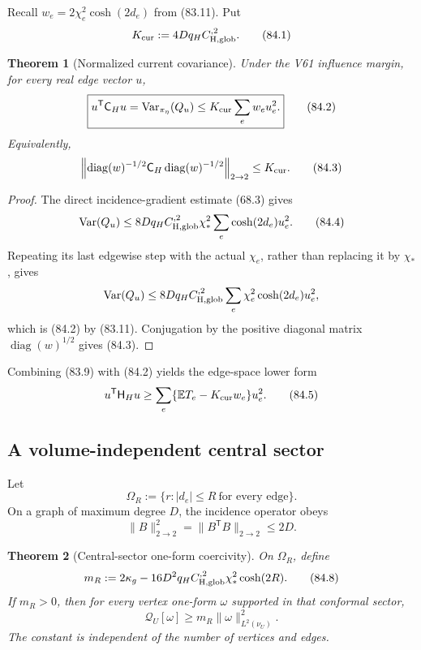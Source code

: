 \documentclass[11pt]{article}
\newtheorem{theorem}{Theorem}[section]
\theoremstyle{remark}
\begin{document}
Recall
\(w_e=2\chi_e^2\cosh(2d_e)\) from (83.11).  Put
\[
 K_{\rm cur}:=4Dq_HC_{\rm H,glob}^{,2}.           \tag{84.1}
\]

\begin{theorem}[Normalized current covariance]
\label{thm:v17v84-normalized}
Under the V61 influence margin, for every real edge vector \(u\),
\[
\boxed{
 u^{\mathsf T}\mathsf C_Hu
 =\operatorname{Var}_{\pi_\eta}(Q_u)
 \leq K_{\rm cur}\sum_ew_eu_e^2.}                \tag{84.2}
\]
Equivalently,
\[
 \left\|
 \operatorname{diag}(w)^{-1/2}\mathsf C_H
 \operatorname{diag}(w)^{-1/2}
 \right\|_{2\to2}
 \leq K_{\rm cur}.                                \tag{84.3}
\]
\end{theorem}

\begin{proof}
The direct incidence-gradient estimate (68.3) gives
\[
 \operatorname{Var}(Q_u)
 \leq8Dq_HC_{\rm H,glob}^{,2}\chi_*^2
       \sum_e\cosh(2d_e)u_e^2.                   \tag{84.4}
\]
Repeating its last edgewise step with the actual \(\chi_e\), rather
than replacing it by \(\chi_*\), gives
\[
 \operatorname{Var}(Q_u)
 \leq8Dq_HC_{\rm H,glob}^{,2}
       \sum_e\chi_e^2\cosh(2d_e)u_e^2,
\]
which is (84.2) by (83.11).  Conjugation by the positive diagonal
matrix \(\operatorname{diag}(w)^{1/2}\) gives (84.3).
\end{proof}

Combining (83.9) with (84.2) yields the edge-space lower form
\[
 u^{\mathsf T}\mathsf H_Hu
 \geq\sum_e\{\mathbb ET_e-K_{\rm cur}w_e\}u_e^2. \tag{84.5}
\]

\subsection{A volume-independent central sector}

Let
\[
 \Omega_R:=\{r: |d_e|\leq R\ \text{for every edge}\}.            \tag{84.6}
\]
On a graph of maximum degree \(D\), the incidence operator obeys
\[
 \|B\|_{2\to2}^2=\|B^{\mathsf T}B\|_{2\to2}
 \leq2D.                                          \tag{84.7}
\]

\begin{theorem}[Central-sector one-form coercivity]
\label{thm:v17v84-central}
On \(\Omega_R\), define
\[
 m_R:=2\kappa_g-
 16D^2q_HC_{\rm H,glob}^{,2}\chi_*^2\cosh(2R).  \tag{84.8}
\]
If \(m_R>0\), then for every vertex one-form \(\omega\) supported in
that conformal sector,
\[
\boxed{
 \mathcal Q_U[\omega]\geq m_R\|\omega\|_{L^2(\nu_U)}^2.}         \tag{84.9}
\]
The constant is independent of the number of vertices and edges.
\end{theorem}
\end{document}
